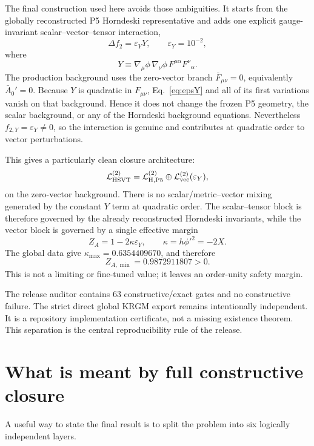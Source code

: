 \documentclass[11pt,a4paper,oneside]{book}
\newcommand{\epsY}{\varepsilon_Y}
\newcommand{\kap}{\kappa}
\newcommand{\Lag}{\mathcal{L}}
\begin{document}
The final construction used here avoids those ambiguities. It starts from the globally reconstructed P5 Horndeski representative and adds one explicit gauge-invariant scalar--vector--tensor interaction,
\begin{equation}
 \Delta f_2=\epsY Y,\qquad \epsY=10^{-2},
 \label{eq:epsY}
\end{equation}
where
\begin{equation}
 Y\equiv \nabla_\mu\phi\,\nabla_\nu\phi\,F^{\mu\alpha}F^{\nu}{}_{\alpha}.
\end{equation}
The production background uses the zero-vector branch $\bar F_{\mu\nu}=0$, equivalently $\bar A_0'=0$. Because $Y$ is quadratic in $F_{\mu\nu}$, Eq.~\eqref{eq:epsY} and all of its first variations vanish on that background. Hence it does not change the frozen P5 geometry, the scalar background, or any of the Horndeski background equations. Nevertheless $f_{2,Y}=\epsY\neq0$, so the interaction is genuine and contributes at quadratic order to vector perturbations.

This gives a particularly clean closure architecture:
\begin{equation}
 \Lag^{(2)}_{\rm HSVT}=\Lag^{(2)}_{\rm H,P5}\oplus \Lag^{(2)}_{\rm vec}(\epsY),
 \label{eq:factor}
\end{equation}
on the zero-vector background. There is no scalar/metric--vector mixing generated by the constant $Y$ term at quadratic order. The scalar--tensor block is therefore governed by the already reconstructed Horndeski invariants, while the vector block is governed by a single effective margin
\begin{equation}
 Z_A=1-2\kap\epsY,\qquad \kap=h\phi'^2=-2X.
 \label{eq:ZA}
\end{equation}
The global data give $\kap_{\max}=0.6354409670$, and therefore
\begin{equation}
 Z_{A,\min}=0.9872911807>0.
\end{equation}
This is not a limiting or fine-tuned value; it leaves an order-unity safety margin.

The release auditor contains 63 constructive/exact gates and no constructive failure. The strict direct global KRGM export remains intentionally independent. It is a repository implementation certificate, not a missing existence theorem. This separation is the central reproducibility rule of the release.

\chapter{What is meant by full constructive closure}
A useful way to state the final result is to split the problem into six logically independent layers.
\end{document}
